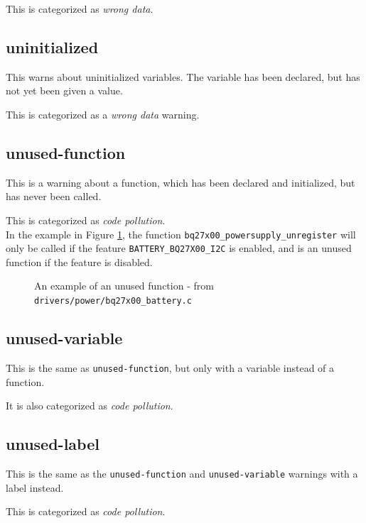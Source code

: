 \documentclass[a4paper,11pt]{report}
\newcommand{\figa}{
    \begin{figure}[!htpb]
    \centering
}
\newcommand{\figb}[2]{
    \caption{#1}
    \label{#2}
    \end{figure}
}
\begin{document}
This is categorized as \emph{wrong data}.

            \fi %

            \subsection*{uninitialized}
This warns about uninitialized variables. The variable has been declared, but 
has not yet been given a value.

This is categorized as a \emph{wrong data} warning.


            \subsection*{unused-function}
This is a warning about a function, which has been declared and initialized, 
but has never been called. 

This is categorized as \emph{code pollution}.
\\

In the example in Figure \ref{lst:unusedfuncreal}, the function 
\texttt{bq27x00\_powersupply\_unregister} will only be called if the feature 
\texttt{BATTERY\_BQ27X00\_I2C} is enabled, and is  an 
unused function if the feature is disabled.

\figa
    
\figb{An example of an unused function - from 
    \texttt{drivers/power/bq27x00\_battery.c}}{lst:unusedfuncreal}


            \subsection*{unused-variable}
This is the same as \texttt{unused-function}, but only with a variable instead 
of a function. 

It is also categorized as \emph{code pollution}.


            \subsection*{unused-label}
This is the same as the \texttt{unused-function} and \texttt{unused-variable} 
warnings with a label instead.

This is categorized as \emph{code pollution}.




\newpage
\end{document}
